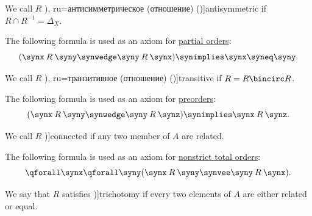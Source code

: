\begin{comments}
\begin{definition}
\begin{thmenum}[resume=def:binary_relation]
     We call \( R \) \term[bg=антисиметрична (релация) (\cite[369]{ГеновМиховскиМоллов1991Алгебра}), ru=антисимметрическое (отношение) (\cite[def. 2.7]{Гуров2013ТеорияРешёток})]{antisymmetric} if \( R \cap R^{-1} = \Delta_X \).

    The following formula is used as an axiom for \hyperref[def:partially_ordered_set]{partial orders}:
    \begin{equation}\label{eq:def:binary_relation/antisymmetric}
      (\synx \mathbin{R} \syny \synwedge \syny \mathbin{R} \synx) \synimplies \synx \syneq \syny.
    \end{equation}

     We call \( R \) \term[bg=транзитивна (релация) (\cite[369]{ГеновМиховскиМоллов1991Алгебра}), ru=транзитивное (отношение) (\cite[def. 2.7]{Гуров2013ТеорияРешёток})]{transitive} if \( R = R \bincirc R \).

    The following formula is used as an axiom for \hyperref[def:partially_ordered_set]{preorders}:
    \begin{equation}\label{eq:def:binary_relation/transitive}
      (\synx \mathbin{R} \syny \synwedge \syny \mathbin{R} \synz) \synimplies \synx \mathbin{R} \synz.
    \end{equation}

     We call \( R \) \term[ru=полное (отношение) (\cite[def. 2.7]{Гуров2013ТеорияРешёток})]{connected} if any two member of \( A \) are related.

    The following formula is used as an axiom for \hyperref[def:totally_ordered_set]{nonstrict total orders}:
    \begin{equation}\label{eq:def:binary_relation/connected}
      \qforall \synx \qforall \syny (\synx \mathbin{R} \syny \synvee \syny \mathbin{R} \synx).
    \end{equation}

     We say that \( R \) satisfies \term[bg=трихотомия (\cite[11]{Тагамлицки1971ДиференциалноСмятане})]{trichotomy} if every two elements of \( A \) are either related or equal.


\end{thmenum}
\end{definition}
\end{comments}

